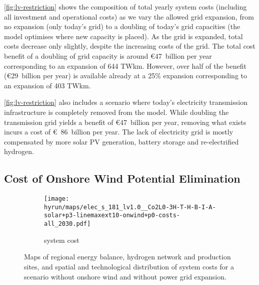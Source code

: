 \cref{fig:lv-restriction} shows the composition of total yearly system costs
(including all investment and operational costs) as we vary the allowed grid
expansion, from no expansion (only today's grid) to a doubling of today's grid
capacities (the model optimises where new capacity is placed). As the grid is
expanded, total costs decrease only slightly, despite the increasing costs of
the grid. The total cost benefit of a doubling of grid capacity is around
\euro47~billion per year corresponding to an expansion of 644 TWkm. However, over
half of the benefit (\euro29~billion per year) is available already at a 25\%
expansion corresponding to an expansion of 403 TWkm.

\cref{fig:lv-restriction} also includes a scenario where today's electricity
transmission infrastructure is completely removed from the model. While doubling
the transmission grid yields a benefit of \euro47~billion per year, removing
what exists incurs a cost of \euro~86~billion per year. The lack of electricity
grid is mostly compensated by more solar PV generation, battery storage and
re-electrified hydrogen.

\subsection{Cost of Onshore Wind Potential Elimination}
\label{sec:si:onw}

\begin{figure}
    \centering
    \begin{subfigure}[t]{0.6\textwidth}
        \centering
        \caption{system cost}
        \texttt{[image: \\hyrun/maps/elec\_s\_181\_lv1.0\_\_Co2L0-3H-T-H-B-I-A-solar+p3-linemaxext10-onwind+p0-costs-all\_2030.pdf]}
        \label{fig:no-onw:tsc}
    \end{subfigure}
    \caption{Maps of regional energy balance, hydrogen network and production sites, and spatial and technological distribution of system costs for a scenario without onshore wind and without power grid expansion.}
    \label{fig:no-onw}
\end{figure}

